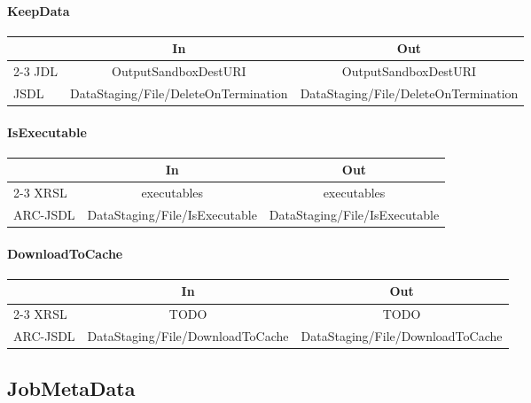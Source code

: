 \documentclass{article}
\newcommand{\todo}{TODO}
\newcommand{\subsubsubsection}[1]{\paragraph{#1}}
\newenvironment{inouttabular}%
{\begin{center}\begin{tabular}{l>{\ttfamily\footnotesize}c>{\ttfamily\footnotesize}c}%
\toprule
& \textnormal{\normalsize{In}} & \textnormal{\normalsize{Out}}\\ \cmidrule{2-3}}
{\bottomrule\end{tabular}\end{center}}
\begin{document}
\subsubsubsection{KeepData}
\begin{inouttabular}
JDL & OutputSandboxDestURI & OutputSandboxDestURI\\
JSDL & DataStaging/File/DeleteOnTermination & DataStaging/File/DeleteOnTermination\\
\end{inouttabular}

\subsubsubsection{IsExecutable}
\begin{inouttabular}
XRSL & executables & executables\\
ARC-JSDL & DataStaging/File/IsExecutable & DataStaging/File/IsExecutable\\
\end{inouttabular}

\subsubsubsection{DownloadToCache}
\begin{inouttabular}
XRSL & \todo{} & \todo{}\\
ARC-JSDL & DataStaging/File/DownloadToCache & DataStaging/File/DownloadToCache\\
\end{inouttabular}


\subsection{JobMetaData}
\end{document}
